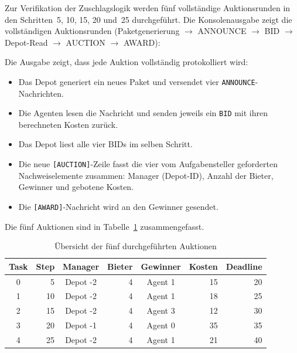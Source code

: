 Zur Verifikation der Zuschlagslogik werden fünf vollständige Auktionsrunden in den Schritten~5, 10, 15, 20 und~25 durchgeführt. Die Konsolenausgabe zeigt die vollständigen Auktionsrunden (Paketgenerierung \(\to\) ANNOUNCE \(\to\) BID \(\to\) Depot-Read \(\to\) AUCTION \(\to\) AWARD):



Die Ausgabe zeigt, dass jede Auktion vollständig protokolliert wird:
\begin{itemize}
    \item Das Depot generiert ein neues Paket und versendet vier \texttt{ANNOUNCE}-Nachrichten.
    \item Die Agenten lesen die Nachricht und senden jeweils ein \texttt{BID} mit ihren berechneten Kosten zurück.
    \item Das Depot liest alle vier BIDs im selben Schritt.
    \item Die neue \texttt{[AUCTION]}-Zeile fasst die vier vom Aufgabensteller geforderten Nachweiselemente zusammen: Manager (Depot-ID), Anzahl der Bieter, Gewinner und gebotene Kosten.
    \item Die \texttt{[AWARD]}-Nachricht wird an den Gewinner gesendet.
\end{itemize}

Die fünf Auktionen sind in Tabelle~\ref{tab:auktionen_2d} zusammengefasst.

\begin{table}[H]
    \centering
    \begin{tabular}{c r c r c r r}
        \toprule
        \textbf{Task} & \textbf{Step} & \textbf{Manager} & \textbf{Bieter} & \textbf{Gewinner} & \textbf{Kosten} & \textbf{Deadline} \\
        \midrule
        0 & 5  & Depot -2 & 4 & Agent 1 & 15 & 20 \\
        1 & 10 & Depot -2 & 4 & Agent 1 & 18 & 25 \\
        2 & 15 & Depot -2 & 4 & Agent 3 & 12 & 30 \\
        3 & 20 & Depot -1 & 4 & Agent 0 & 35 & 35 \\
        4 & 25 & Depot -2 & 4 & Agent 1 & 21 & 40 \\
        \bottomrule
    \end{tabular}
    \caption{Übersicht der fünf durchgeführten Auktionen}
    \label{tab:auktionen_2d}
\end{table}

